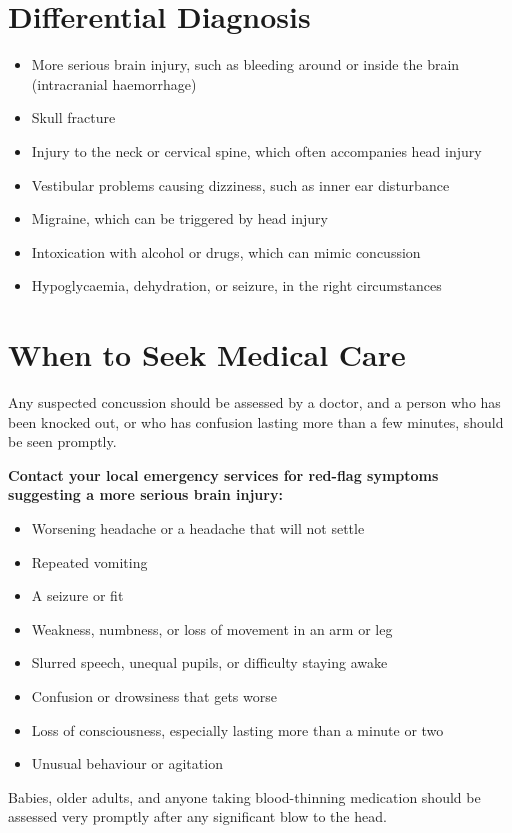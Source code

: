 \section*{Differential Diagnosis}
\begin{itemize}
    \item More serious brain injury, such as bleeding around or inside the brain (intracranial haemorrhage)
    \item Skull fracture
    \item Injury to the neck or cervical spine, which often accompanies head injury
    \item Vestibular problems causing dizziness, such as inner ear disturbance
    \item Migraine, which can be triggered by head injury
    \item Intoxication with alcohol or drugs, which can mimic concussion
    \item Hypoglycaemia, dehydration, or seizure, in the right circumstances
\end{itemize}

\section*{When to Seek Medical Care}
Any suspected concussion should be assessed by a doctor, and a person who has been knocked out, or who has confusion lasting more than a few minutes, should be seen promptly.

\textbf{Contact your local emergency services for red-flag symptoms suggesting a more serious brain injury:}
\begin{itemize}
    \item Worsening headache or a headache that will not settle
    \item Repeated vomiting
    \item A seizure or fit
    \item Weakness, numbness, or loss of movement in an arm or leg
    \item Slurred speech, unequal pupils, or difficulty staying awake
    \item Confusion or drowsiness that gets worse
    \item Loss of consciousness, especially lasting more than a minute or two
    \item Unusual behaviour or agitation
\end{itemize}
Babies, older adults, and anyone taking blood-thinning medication should be assessed very promptly after any significant blow to the head.

